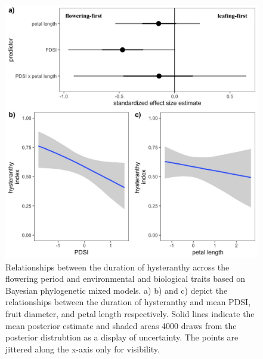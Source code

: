 \documentclass{article}[12pt]
\begin{document}
\begin{figure}[h!]
    \centering
 \includegraphics[width=\textwidth]{..//..//Plots/whatReviwerswant/hypoth_preds.jpeg}
    \caption{Relationships between the duration of hysteranthy across the flowering period and environmental and biological traits based on Bayesian phylogenetic mixed models. a) b) and c) depict the relationships between the duration of hysteranthy and mean PDSI, fruit diameter, and petal length respectively. Solid lines indicate the mean posterior estimate and shaded areas 4000 draws from the posterior distrubtion as a display of uncertainty. The points are jittered along the x-axis only for visibility.}
    \label{fig:prunes}
\end{figure}
\end{document}
